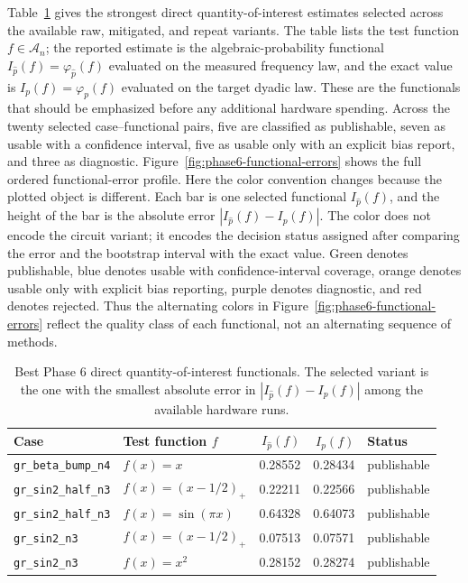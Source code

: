 Table~\ref{tab:phase6-functional-decisions} gives the strongest direct
quantity-of-interest estimates selected across the available raw, mitigated,
and repeat variants. The table lists the test function \(f\in\mathcal{A}_n\);
the reported estimate is the algebraic-probability functional
\(I_{\hat p}(f)=\varphi_{\hat p}(f)\) evaluated on the measured frequency law,
and the exact value is \(I_p(f)=\varphi_p(f)\) evaluated on the target dyadic
law. These are the functionals that should be emphasized before any additional
hardware spending. Across the twenty selected case--functional pairs, five are
classified as publishable, seven as usable with a confidence interval, five as
usable only with an explicit bias report, and three as diagnostic.
Figure~\ref{fig:phase6-functional-errors} shows the full ordered
functional-error profile. Here the color convention changes because the plotted
object is different. Each bar is one selected functional \(I_{\hat p}(f)\), and
the height of the bar is the absolute error
\(|I_{\hat p}(f)-I_p(f)|\). The color does not encode the circuit variant; it
encodes the decision status assigned after comparing the error and the
bootstrap interval with the exact value. Green denotes publishable, blue
denotes usable with confidence-interval coverage, orange denotes usable only
with explicit bias reporting, purple denotes diagnostic, and red denotes
rejected. Thus the alternating colors in Figure~\ref{fig:phase6-functional-errors}
reflect the quality class of each functional, not an alternating sequence of
methods.

\begin{table}[h]
\centering
\begin{tabular}{llrrl}
\toprule
Case & Test function \(f\) & \(I_{\hat p}(f)\) & \(I_p(f)\) & Status \\
\midrule
\texttt{gr\_beta\_bump\_n4} & \(f(x)=x\)
& 0.28552 & 0.28434 & publishable \\
\texttt{gr\_sin2\_half\_n3} & \(f(x)=(x-1/2)_+\)
& 0.22211 & 0.22566 & publishable \\
\texttt{gr\_sin2\_half\_n3} & \(f(x)=\sin(\pi x)\)
& 0.64328 & 0.64073 & publishable \\
\texttt{gr\_sin2\_n3} & \(f(x)=(x-1/2)_+\)
& 0.07513 & 0.07571 & publishable \\
\texttt{gr\_sin2\_n3} & \(f(x)=x^2\)
& 0.28152 & 0.28274 & publishable \\
\bottomrule
\end{tabular}
\caption{Best Phase 6 direct quantity-of-interest functionals. The selected
variant is the one with the smallest absolute error in
\(|I_{\hat p}(f)-I_p(f)|\) among the available hardware runs.}
\label{tab:phase6-functional-decisions}
\end{table}

